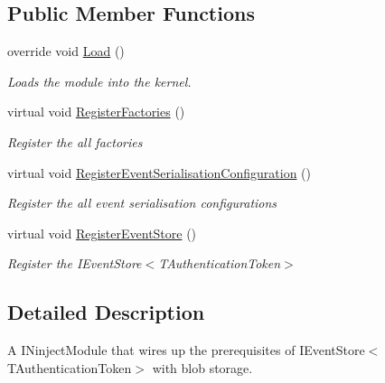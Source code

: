 \subsection*{Public Member Functions}
\begin{DoxyCompactItemize}
\item 
override void \hyperlink{classCqrs_1_1Ninject_1_1Azure_1_1BlobStorage_1_1Configuration_1_1BlobStoragEventStoreModule_a76808b1263f1086b834a21ad82a0604f_a76808b1263f1086b834a21ad82a0604f}{Load} ()
\begin{DoxyCompactList}\small\item\em Loads the module into the kernel. \end{DoxyCompactList}\item 
virtual void \hyperlink{classCqrs_1_1Ninject_1_1Azure_1_1BlobStorage_1_1Configuration_1_1BlobStoragEventStoreModule_a5afa83a73b65a61272d3c18a2f6fd214_a5afa83a73b65a61272d3c18a2f6fd214}{Register\+Factories} ()
\begin{DoxyCompactList}\small\item\em Register the all factories \end{DoxyCompactList}\item 
virtual void \hyperlink{classCqrs_1_1Ninject_1_1Azure_1_1BlobStorage_1_1Configuration_1_1BlobStoragEventStoreModule_a546c871cff486df5efba7e0f9e3ceb96_a546c871cff486df5efba7e0f9e3ceb96}{Register\+Event\+Serialisation\+Configuration} ()
\begin{DoxyCompactList}\small\item\em Register the all event serialisation configurations \end{DoxyCompactList}\item 
virtual void \hyperlink{classCqrs_1_1Ninject_1_1Azure_1_1BlobStorage_1_1Configuration_1_1BlobStoragEventStoreModule_a579cbe7615e4cf812946ff43e3a5aebd_a579cbe7615e4cf812946ff43e3a5aebd}{Register\+Event\+Store} ()
\begin{DoxyCompactList}\small\item\em Register the I\+Event\+Store$<$\+T\+Authentication\+Token$>$ \end{DoxyCompactList}\end{DoxyCompactItemize}


\subsection{Detailed Description}
A I\+Ninject\+Module that wires up the prerequisites of I\+Event\+Store$<$\+T\+Authentication\+Token$>$ with blob storage. 


